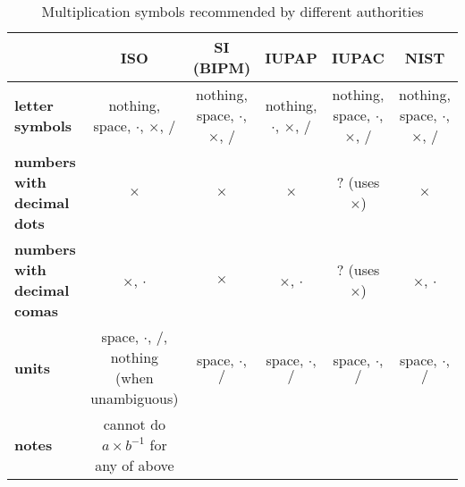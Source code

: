 \documentclass{article}
\begin{document}
\begin{table}[]
    \caption{Multiplication symbols recommended by different authorities}
    \begin{tabularx}{\textwidth}{|L|C|C|C|C|C|}
        \hline
        & \textbf{ISO}                                    & \textbf{SI (BIPM)}                     & \textbf{IUPAP}                  & \textbf{IUPAC}                         & \textbf{NIST}                          \\ \hline
        \textbf{letter symbols}             & nothing, space, $\cdot$, $\times$, $/$          & nothing, space, $\cdot$, $\times$, $/$ & nothing,\newline $\cdot$, $\times$, $/$ & nothing, space, $\cdot$, $\times$, $/$ & nothing, space, $\cdot$, $\times$, $/$ \\ \hline
        \textbf{numbers with decimal dots}  & $\times$                                        & $\times$                               & $\times$                        & ? (uses $\times$)                      & $\times$                               \\ \hline
        \textbf{numbers with decimal comas} & $\times$, $\cdot$                               & $\times$                               & $\times$, $\cdot$               & ? (uses $\times$)                      & $\times$, $\cdot$                      \\ \hline
        \textbf{units}                      & space, $\cdot$, $/$, nothing (when unambiguous) & space, $\cdot$, $/$                    & space, $\cdot$, $/$             & space, $\cdot$, $/$                    & space, $\cdot$, $/$                    \\ \hline
        \textbf{notes}                               & cannot do $a \times b^{-1}$ for any of above    &                                        &                                 &                                        &                                        \\ \hline
    \end{tabularx}
\end{table}
\end{document}
